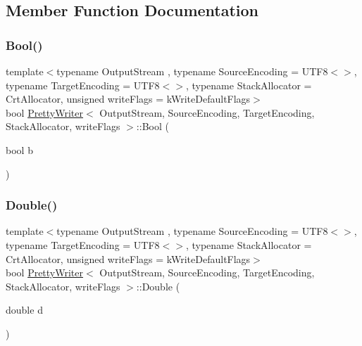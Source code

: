 \subsection{Member Function Documentation}
\mbox{\label{classPrettyWriter_a6e765ee7ada5ed40f317c78a98f6f90b}} 
\subsubsection{\texorpdfstring{Bool()}{Bool()}}
{\footnotesize\ttfamily template$<$typename Output\+Stream , typename Source\+Encoding  = U\+T\+F8$<$$>$, typename Target\+Encoding  = U\+T\+F8$<$$>$, typename Stack\+Allocator  = Crt\+Allocator, unsigned write\+Flags = k\+Write\+Default\+Flags$>$ \\
bool \hyperlink{classPrettyWriter}{Pretty\+Writer}$<$ Output\+Stream, Source\+Encoding, Target\+Encoding, Stack\+Allocator, write\+Flags $>$\+::Bool (\begin{DoxyParamCaption}\item[{bool}]{b }\end{DoxyParamCaption})\hspace{0.3cm}{\ttfamily [inline]}}

\mbox{\label{classPrettyWriter_ad9d592e86b985da666665926e87db415}} 
\subsubsection{\texorpdfstring{Double()}{Double()}}
{\footnotesize\ttfamily template$<$typename Output\+Stream , typename Source\+Encoding  = U\+T\+F8$<$$>$, typename Target\+Encoding  = U\+T\+F8$<$$>$, typename Stack\+Allocator  = Crt\+Allocator, unsigned write\+Flags = k\+Write\+Default\+Flags$>$ \\
bool \hyperlink{classPrettyWriter}{Pretty\+Writer}$<$ Output\+Stream, Source\+Encoding, Target\+Encoding, Stack\+Allocator, write\+Flags $>$\+::Double (\begin{DoxyParamCaption}\item[{double}]{d }\end{DoxyParamCaption})\hspace{0.3cm}{\ttfamily [inline]}}

\mbox{\label{classPrettyWriter_a1e9d97fc950d349f55abd864c787ff37}} 
